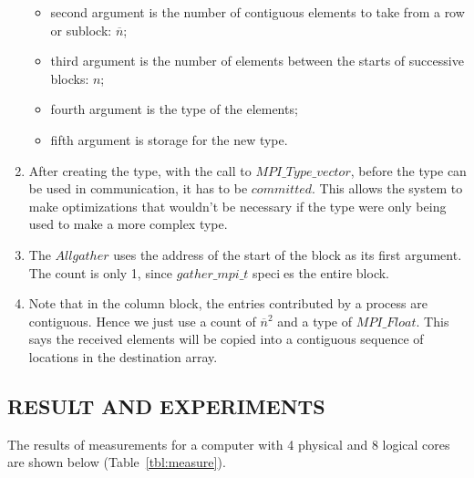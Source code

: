 \begin{enumerate}
{\begin{itemize}
            \item second argument is the number of contiguous elements to take from a row or sublock: $\overline{n}$;
            \item third argument is the number of elements between the starts of successive blocks: $n$;
            \item fourth argument is the type of the elements;
            \item fifth argument is storage for the new type.
        \end{itemize}
    } \item After creating the type, with the call to $MPI\_Type\_vector$, before the type can be used in communication, it has to be $committed$. This allows the system to make optimizations that wouldn't be necessary if the type were only being used to make a more complex type.
    \item The $Allgather$ uses the address of the start of the block as its first argument. The count is only 1, since $gather\_mpi\_t$ species the entire block.
    \item Note that in the column block, the entries contributed by a process are contiguous. Hence we just use a count of $\overline{n}^2$ and a type of $MPI\_Float$. This says the received elements will be copied into a contiguous sequence of locations in the destination array.
\end{enumerate}

\subsection{RESULT AND EXPERIMENTS}\label{subsec:result_exp}

The results of measurements for a computer with 4 physical and 8 logical cores are shown below (Table~\ref{tbl:measure}).

